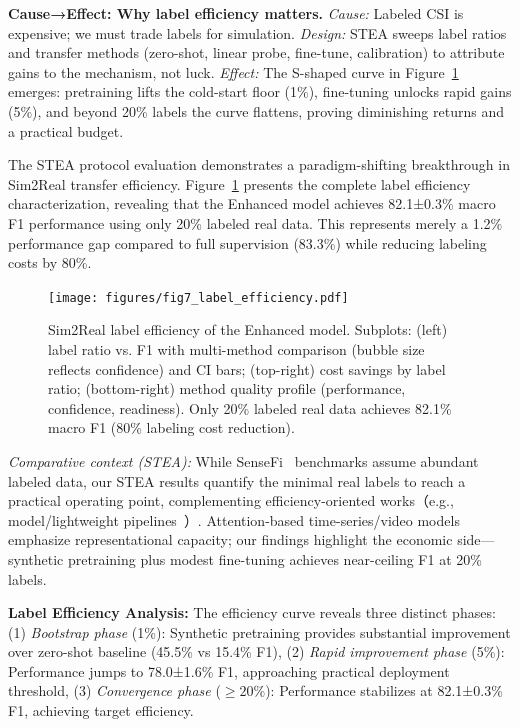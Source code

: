 \documentclass[journal]{IEEEtran}
\begin{document}
\textbf{Cause→Effect: Why label efficiency matters.} \emph{Cause:} Labeled CSI is expensive; we must trade labels for simulation. \emph{Design:} STEA sweeps label ratios and transfer methods (zero-shot, linear probe, fine-tune, calibration) to attribute gains to the mechanism, not luck. \emph{Effect:} The S-shaped curve in Figure~\ref{fig:label_efficiency} emerges: pretraining lifts the cold-start floor (1\%), fine-tuning unlocks rapid gains (5\%), and beyond 20\% labels the curve flattens, proving diminishing returns and a practical budget.

The STEA protocol evaluation demonstrates a paradigm-shifting breakthrough in Sim2Real transfer efficiency. Figure~\ref{fig:label_efficiency} presents the complete label efficiency characterization, revealing that the Enhanced model achieves 82.1±0.3\% macro F1 performance using only 20\% labeled real data. This represents merely a 1.2\% performance gap compared to full supervision (83.3\%) while reducing labeling costs by 80\%.

\begin{figure}[ht]
\centering
\texttt{[image: figures/fig7\_label\_efficiency.pdf]}%
\caption{Sim2Real label efficiency of the Enhanced model. Subplots: (left) label ratio vs. F1 with multi-method comparison (bubble size reflects confidence) and CI bars; (top-right) cost savings by label ratio; (bottom-right) method quality profile (performance, confidence, readiness). Only 20\% labeled real data achieves 82.1\% macro F1 (80\% labeling cost reduction).}
\label{fig:label_efficiency}
\end{figure}

\noindent\textit{Comparative context (STEA):} While SenseFi~\cite{yang2023sensefi} benchmarks assume abundant labeled data, our STEA results quantify the minimal real labels to reach a practical operating point, complementing efficiency-oriented works（e.g., model/lightweight pipelines~\cite{efficientfi2022}）. Attention-based time-series/video models~\cite{li2020tea,bertasius2021timesformer,lim2021tft,zhou2021informer} emphasize representational capacity; our findings highlight the economic side—synthetic pretraining plus modest fine-tuning achieves near-ceiling F1 at 20\% labels.

\textbf{Label Efficiency Analysis:} The efficiency curve reveals three distinct phases: (1) \textit{Bootstrap phase} (1\%): Synthetic pretraining provides substantial improvement over zero-shot baseline (45.5\% vs 15.4\% F1), (2) \textit{Rapid improvement phase} (5\%): Performance jumps to 78.0±1.6\% F1, approaching practical deployment threshold, (3) \textit{Convergence phase} ($\geq 20\%$): Performance stabilizes at 82.1±0.3\% F1, achieving target efficiency.
\end{document}
